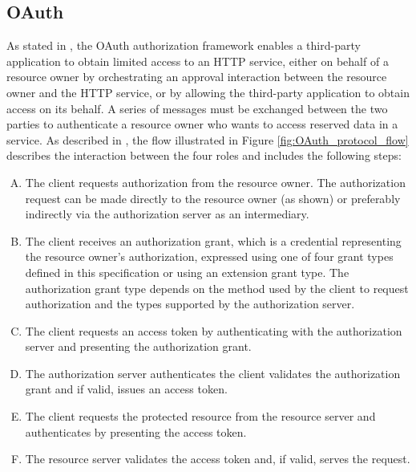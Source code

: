 \subsection{OAuth}
As stated in \cite{ietf_oauth2}, the \gls{OAuth} authorization framework enables a third-party application to obtain limited access to an HTTP service, either on behalf of a resource owner by orchestrating an approval interaction between the resource owner and the HTTP service, or by allowing the third-party application to obtain access on its behalf.
A series of messages must be exchanged between the two parties to authenticate a resource owner who wants to access reserved data in a service. As described in \cite{ietf_oauth2}, the flow illustrated in Figure \ref{fig:OAuth_protocol_flow} describes the interaction between the four roles and includes the following steps:
\begin{enumerate}[(A)]
    \item The client requests authorization from the resource owner. The authorization request can be made directly to the resource owner (as shown) or preferably indirectly via the authorization server as an intermediary.
    \item The client receives an authorization grant, which is a credential representing the resource owner's authorization, expressed using one of four grant types defined in this specification or using an extension grant type. The authorization grant type depends on the method used by the client to request authorization and the types supported by the authorization server.
    \item The client requests an access token by authenticating with the authorization server and presenting the authorization grant.
    \item The authorization server authenticates the client validates the authorization grant and if valid, issues an access token.
    \item The client requests the protected resource from the resource server and authenticates by presenting the access token.
    \item The resource server validates the access token and, if valid, serves the request.
\end{enumerate}
 
